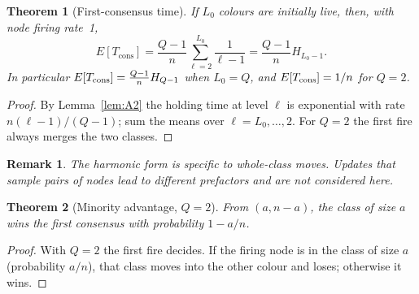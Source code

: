 \documentclass[pdflatex,sn-mathphys-num]{sn-jnl}
\theoremstyle{thmstyleone}%
\newtheorem{theorem}{Theorem}[section]
\theoremstyle{thmstylethree}%
\theoremstyle{thmstyletwo}%
\newtheorem{remark}{Remark}[theorem]
\begin{document}
\begin{theorem}[First-consensus time]
\label{thm:A3}
If $L_0$ colours are initially live, then, with node firing rate~1,
\[
E[T_{\mathrm{cons}}]=\frac{Q-1}{n}\sum_{\ell=2}^{L_0}\frac{1}{\ell-1}
=\frac{Q-1}{n}H_{L_0-1}.
\]
In particular $E[T_{\rm cons}]=\frac{Q-1}{n}H_{Q-1}$ when $L_0=Q$, and
$E[T_{\rm cons}]=1/n$ for $Q=2$.
\end{theorem}
\begin{proof}
By Lemma~\ref{lem:A2} the holding time at level $\ell$ is exponential with
rate $n(\ell-1)/(Q-1)$; sum the means over $\ell=L_0,\dots,2$. For $Q=2$
the first fire always merges the two classes.
\end{proof}
\begin{remark}
\label{rem:A3.1}
The harmonic form is specific to whole-class moves. Updates that sample
pairs of nodes lead to different prefactors and are not considered here.
\end{remark}

\begin{theorem}[Minority advantage, $Q=2$]
\label{thm:A4}
From $(a,n-a)$, the class of size $a$ wins the first consensus with
probability $1-a/n$.
\end{theorem}
\begin{proof}
With $Q=2$ the first fire decides. If the firing node is in the class of
size $a$ (probability $a/n$), that class moves into the other colour and
loses; otherwise it wins.
\end{proof}
\end{document}
